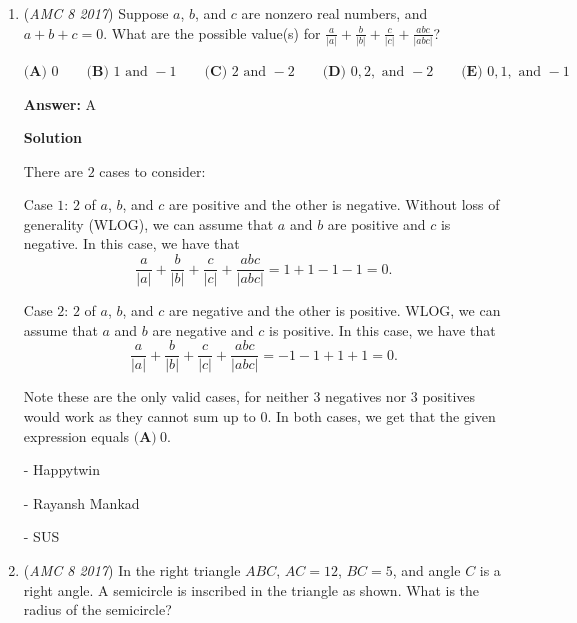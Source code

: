 \begin{enumerate}
There are $5$ options for the last digit $(1,3,5,7,9)$ as the integer must be odd. The first digit now has $8$ options left (it can't be $0$ or the same as the last digit). The second digit also has $8$ options left (it can't be the same as the first or last digit). Finally, the third digit has $7$ options (it can't be the same as the three digits that are already chosen). 

 Since there are $9,000$ total integers, our answer is 
 \[\frac{8 \cdot 8 \cdot 7 \cdot 5}{9000} = \boxed{\textbf{(B)}\ \frac{56}{225}}.\]



	\item (\textit{AMC 8 2017}) Suppose $a$, $b$, and $c$ are nonzero real numbers, and $a+b+c=0$. What are the possible value(s) for $\frac{a}{|a|}+\frac{b}{|b|}+\frac{c}{|c|}+\frac{abc}{|abc|}$?


 $\textbf{(A) }0\qquad\textbf{(B) }1\text{ and }-1\qquad\textbf{(C) }2\text{ and }-2\qquad\textbf{(D) }0,2,\text{ and }-2\qquad\textbf{(E) }0,1,\text{ and }-1$

 \textbf{Answer: }A



\textbf{Solution}

There are $2$ cases to consider:

 Case $1$: $2$ of $a$, $b$, and $c$ are positive and the other is negative. Without loss of generality (WLOG), we can assume that $a$ and $b$ are positive and $c$ is negative. In this case, we have that 
 \[\frac{a}{|a|}+\frac{b}{|b|}+\frac{c}{|c|}+\frac{abc}{|abc|}=1+1-1-1=0.\]

 Case $2$: $2$ of $a$, $b$, and $c$ are negative and the other is positive. WLOG, we can assume that $a$ and $b$ are negative and $c$ is positive. In this case, we have that 
 \[\frac{a}{|a|}+\frac{b}{|b|}+\frac{c}{|c|}+\frac{abc}{|abc|}=-1-1+1+1=0.\]

 Note these are the only valid cases, for neither $3$ negatives nor $3$ positives would work as they cannot sum up to $0$. In both cases, we get that the given expression equals $\boxed{\textbf{(A)}\ 0}$.

 - Happytwin

 


 - Rayansh Mankad

 - SUS

 


	\item (\textit{AMC 8 2017}) In the right triangle $ABC$, $AC=12$, $BC=5$, and angle $C$ is a right angle. A semicircle is inscribed in the triangle as shown. What is the radius of the semicircle?


\end{enumerate}

